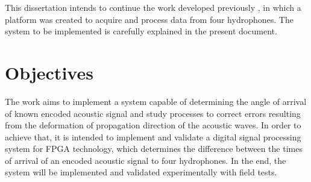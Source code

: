 
This dissertation intends to continue the work developed previously \cite{afonso-thesis}, in which a platform was created to acquire and process data from four hydrophones. The system to be implemented is carefully explained in the present document.
 


\section{Objectives} \label{sec:objective}

The work aims to implement a system capable of determining the angle of arrival of known encoded acoustic signal and study processes to correct errors resulting from the deformation of propagation direction of the acoustic waves. In order to achieve that, it is intended to implement and validate a digital signal processing system for FPGA technology, which determines the difference between the times of arrival of an encoded acoustic signal to four hydrophones. In the end, the system will be implemented and validated experimentally with field tests.
